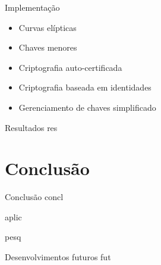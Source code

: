 \documentclass[notes,blue,mathserif]{beamer}
\begin{document}
\begin{frame}{Implementa\c{c}\~{a}o}
	\begin{itemize}[<+->]
	\item Curvas el\'{i}pticas
	\item Chaves menores
	\item Criptografia auto-certificada
	\item Criptografia baseada em identidades
	\item Gerenciamento de chaves simplificado
\end{itemize}
\end{frame}

\begin{frame}{Resultados}
res
\end{frame}


\section{Conclus\~{a}o}
\begin{frame}{Conclus\~{a}o}
concl
\end{frame}

\begin{frame}
aplic
\end{frame}

\begin{frame}
pesq
\end{frame}

\begin{frame}{Desenvolvimentos futuros}
fut
\end{frame}
\end{document}
